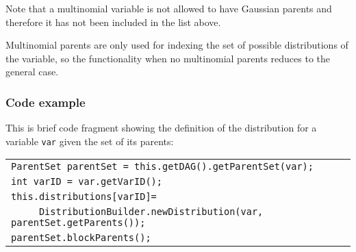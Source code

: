 Note that a multinomial variable is not allowed to have Gaussian parents and therefore it has not been included in the list above.

Multinomial parents are only used for indexing the set of possible distributions of the variable, so the functionality when no multinomial parents reduces to the general case.


\subsubsection*{Code example}

This is brief code fragment showing the definition of the distribution for a variable \texttt{var} given the set of its parents:

\begin{table}[H]
\begin{tabular}{l} \hline

        \texttt{ParentSet parentSet = this.getDAG().getParentSet(var);}\\
        \texttt{int varID = var.getVarID();}\\

        \texttt{this.distributions[varID]= }\\
         \texttt{~~~~~DistributionBuilder.newDistribution(var, parentSet.getParents());}\\
        \texttt{parentSet.blockParents();}\\ \hline 

\end{tabular}
\end{table}


            

            
            
           